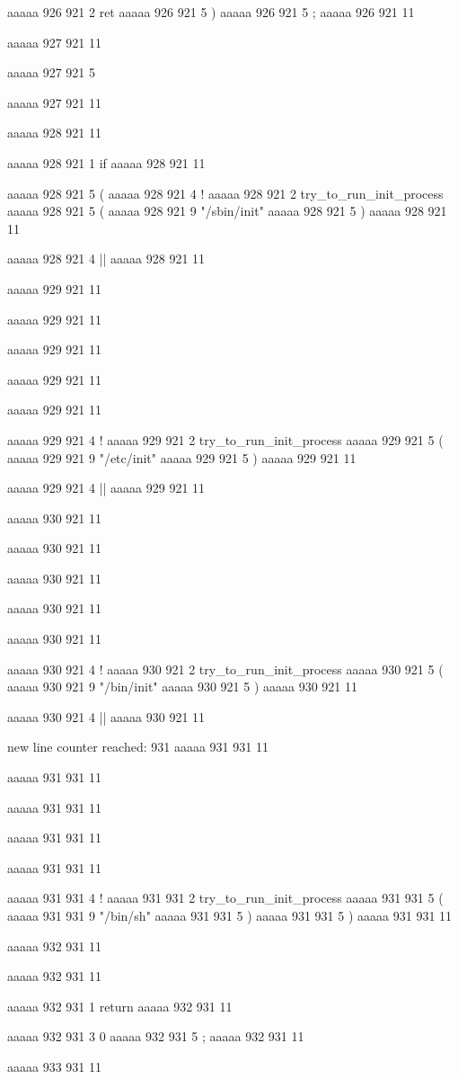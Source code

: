 {{aaaaa 926 921
2
ret
aaaaa 926 921
5
)
aaaaa 926 921
5
;
aaaaa 926 921
11


aaaaa 927 921
11
	
aaaaa 927 921
5
}
aaaaa 927 921
11


aaaaa 928 921
11
	
aaaaa 928 921
1
if
aaaaa 928 921
11
 
aaaaa 928 921
5
(
aaaaa 928 921
4
!
aaaaa 928 921
2
try_to_run_init_process
aaaaa 928 921
5
(
aaaaa 928 921
9
"/sbin/init"
aaaaa 928 921
5
)
aaaaa 928 921
11
 
aaaaa 928 921
4
||
aaaaa 928 921
11


aaaaa 929 921
11
	
aaaaa 929 921
11
 
aaaaa 929 921
11
 
aaaaa 929 921
11
 
aaaaa 929 921
11
 
aaaaa 929 921
4
!
aaaaa 929 921
2
try_to_run_init_process
aaaaa 929 921
5
(
aaaaa 929 921
9
"/etc/init"
aaaaa 929 921
5
)
aaaaa 929 921
11
 
aaaaa 929 921
4
||
aaaaa 929 921
11


aaaaa 930 921
11
	
aaaaa 930 921
11
 
aaaaa 930 921
11
 
aaaaa 930 921
11
 
aaaaa 930 921
11
 
aaaaa 930 921
4
!
aaaaa 930 921
2
try_to_run_init_process
aaaaa 930 921
5
(
aaaaa 930 921
9
"/bin/init"
aaaaa 930 921
5
)
aaaaa 930 921
11
 
aaaaa 930 921
4
||
aaaaa 930 921
11


new line counter reached: 931
aaaaa 931 931
11
	
aaaaa 931 931
11
 
aaaaa 931 931
11
 
aaaaa 931 931
11
 
aaaaa 931 931
11
 
aaaaa 931 931
4
!
aaaaa 931 931
2
try_to_run_init_process
aaaaa 931 931
5
(
aaaaa 931 931
9
"/bin/sh"
aaaaa 931 931
5
)
aaaaa 931 931
5
)
aaaaa 931 931
11


aaaaa 932 931
11
	
aaaaa 932 931
11
	
aaaaa 932 931
1
return
aaaaa 932 931
11
 
aaaaa 932 931
3
0
aaaaa 932 931
5
;
aaaaa 932 931
11


aaaaa 933 931
11


}
